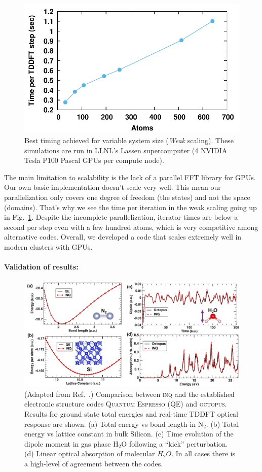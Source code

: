 \begin{figure}[h]
	\centering
	\includegraphics[width=0.66\linewidth]{figures/scaling/weak}
	\caption{
		Best timing achieved for variable system size (\emph{Weak} scaling).
		These simulations are run in LLNL's Lassen supercomputer (4 NVIDIA Tesla P100 Pascal GPUs per compute node).
	}
	\label{fig:scaling_weak}
\end{figure}

The main limitation to scalability is the lack of a parallel FFT library for GPUs. 
Our own basic implementation doesn't scale very well. 
This mean our parallelization only covers one degree of freedom (the states) and not the space (domains). 
That's why we see the time per iteration in the weak scaling going up in Fig.~\ref{fig:scaling_weak}.
Despite the incomplete parallelization, iterator times are below a second per step even with a few hundred atoms, which is very competitive among alternative codes.
Overall, we developed a code that scales extremely well in modern clusters with GPUs.

\paragraph{Validation of results:}
\begin{figure}[h]
	\centering
	\includegraphics[width=0.66\linewidth]{figures/Results-Fig.pdf}
	\caption{
		(Adapted from Ref.~\cite{Andrade2021}.) 
		Comparison between \textsc{inq} and the established electronic structure codes \textsc{Quantum Espresso} (QE) and \textsc{octopus}.
Results for ground state total energies and real-time TDDFT optical response are shown. 
		(a) Total energy vs bond length in \(\mathrm{N_2}\).
		(b) Total energy vs lattice constant in bulk Silicon. 
		(c) Time evolution of the dipole moment in gas phase \(\mathrm{H_2O}\) following a ``kick'' perturbation. 
		(d) Linear optical absorption of molecular \(H_2O\). 
		In all cases there is a high-level of agreement between the codes.
	}
	\label{fig:inq_results}
\end{figure}

